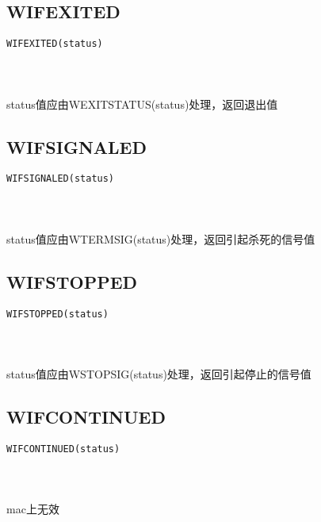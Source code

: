 \documentclass[10pt,a4paper]{article}
\begin{document}
\subsection{WIFEXITED}
\begin{spacing}{2.0}
\lstset{language=C,numbers=none}
\begin{lstlisting}
WIFEXITED(status)
\end{lstlisting}
{\large\color[rgb]{0.2,0.4,0.6}{status:}}
\paragraph{ \ \ }status值应由WEXITSTATUS(status)处理，返回退出值
\end{spacing}

\subsection{WIFSIGNALED}
\begin{spacing}{2.0}
\lstset{language=C,numbers=none}
\begin{lstlisting}
WIFSIGNALED(status)
\end{lstlisting}
{\large\color[rgb]{0.2,0.4,0.6}{status:}}
\paragraph{ \ \ }status值应由WTERMSIG(status)处理，返回引起杀死的信号值
\end{spacing}

\subsection{WIFSTOPPED}
\begin{spacing}{2.0}
\lstset{language=C,numbers=none}
\begin{lstlisting}
WIFSTOPPED(status)
\end{lstlisting}
{\large\color[rgb]{0.2,0.4,0.6}{status:}}
\paragraph{ \ \ }status值应由WSTOPSIG(status)处理，返回引起停止的信号值
\end{spacing}

\subsection{WIFCONTINUED}
\begin{spacing}{2.0}
\lstset{language=C,numbers=none}
\begin{lstlisting}
WIFCONTINUED(status)
\end{lstlisting}
{\large\color[rgb]{0.2,0.4,0.6}{status:}}
\paragraph{ \ \ }mac上无效
\end{spacing}
\end{document}
